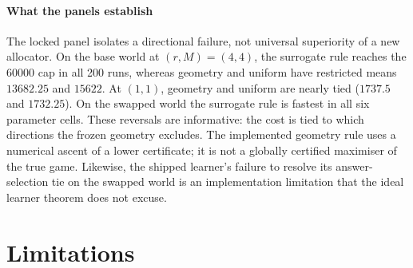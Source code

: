 \paragraph{What the panels establish}
The locked panel isolates a directional failure, not universal superiority of a new allocator.
On the base world at $(r,M)=(4,4)$, the surrogate rule reaches the $60000$ cap in all 200 runs,
whereas geometry and uniform have restricted means $13682.25$ and $15622$.
At $(1,1)$, geometry and uniform are nearly tied ($1737.5$ and $1732.25$).
On the swapped world the surrogate rule is fastest in all six parameter cells. These reversals
are informative: the cost is tied to which directions the frozen geometry excludes.
The implemented geometry rule uses a numerical ascent of a lower certificate; it is not a
globally certified maximiser of the true game. Likewise, the shipped learner's failure to
resolve its answer-selection tie on the swapped world is an implementation limitation that
the ideal learner theorem does not excuse.

\section{Limitations}
\label{sec:limits}

